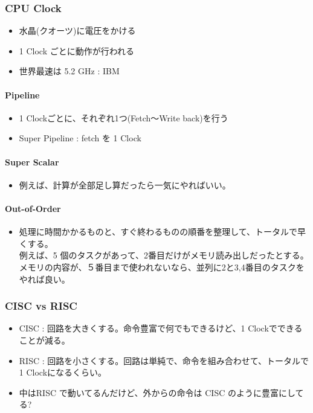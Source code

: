 \documentclass{jsarticle}
\begin{document}
\subsubsection{CPU Clock}

\begin{itemize}
\item
  水晶(クオーツ)に電圧をかける
\item
  1 Clock ごとに動作が行われる
\item
  世界最速は 5.2 GHz : IBM
\end{itemize}
\paragraph{Pipeline}

\begin{itemize}
\item
  1 Clockごとに、それぞれ1つ(Fetch〜Write back)を行う
\item
  Super Pipeline : fetch を 1 Clock
\end{itemize}
\paragraph{Super Scalar}

\begin{itemize}
\item
  例えば、計算が全部足し算だったら一気にやればいい。
\end{itemize}
\paragraph{Out-of-Order}

\begin{itemize}
\item
  処理に時間かかるものと、すぐ終わるものの順番を整理して、トータルで早くする。\\
  例えば、5
  個のタスクがあって、2番目だけがメモリ読み出しだったとする。\\
  メモリの内容が、５番目まで使われないなら、並列に2と3,4番目のタスクをやれば良い。
\end{itemize}
\subsubsection{CISC vs RISC}

\begin{itemize}
\item
  CISC : 回路を大きくする。命令豊富で何でもできるけど、1
  Clockでできることが減る。
\item
  RISC : 回路を小さくする。回路は単純で、命令を組み合わせて、トータルで1
  Clockになるくらい。
\item
  中はRISC で動いてるんだけど、外からの命令は CISC のように豊富にしてる?
\end{itemize}
\end{document}
